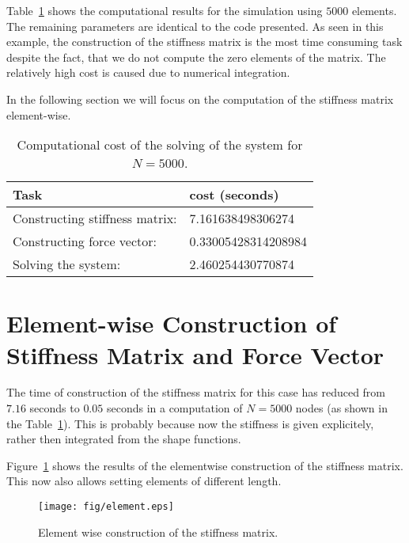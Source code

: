 \documentclass[twoside,a4paper,12pt]{article}
\newcommand{\figref}[1]{Figure~\ref{#1}}
\newcommand{\tabref}[1]{Table~\ref{#1}}
\begin{document}
\tabref{tab:comp-cost} shows the computational results for the
simulation using $5000$ elements. The remaining parameters are
identical to the code presented. As seen in this example, the
construction of the stiffness matrix is the most time consuming task
despite the fact, that we do not compute the zero elements of the
matrix. The relatively high cost is caused due to numerical
integration.

In the following section we will focus on the computation of the
stiffness matrix element-wise.

\begin{table}
  \centering
  \label{tab:comp-cost}
\caption{Computational cost of the solving of the system for $N=5000$.}
\begin{tabular}{ll}
  \toprule
  Task & cost (seconds)\\
  \midrule
  Constructing stiffness matrix: & 7.161638498306274   \\
  Constructing force vector:     & 0.33005428314208984 \\
  Solving the system:            & 2.460254430770874   \\
  \bottomrule
\end{tabular}
\end{table}



\section{Element-wise Construction of Stiffness Matrix and Force Vector}

The time of construction of the stiffness matrix for this case has
reduced from $7.16$ seconds to $0.05$ seconds in a computation of
$N= 5000$ nodes (as shown in the \tabref{tab:comp-cost}). This is
probably because now the stiffness is given explicitely, rather then
integrated from the shape functions.

\figref{fig:element} shows the results of the elementwise construction
of the stiffness matrix. This now also allows setting elements of
different length.

\begin{figure}
  \centering
  \texttt{[image: fig/element.eps]}
  \caption{Element wise construction of the stiffness matrix.}
  \label{fig:element}
\end{figure}


\end{document}
